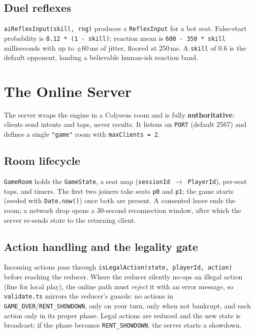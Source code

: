 \documentclass[11pt,a4paper]{article}
\newcommand{\code}[1]{\texttt{#1}}
\begin{document}
\subsection{Duel reflexes}
\code{aiReflexInput(skill, rng)} produces a \code{ReflexInput} for a bot seat.
False-start probability is \code{0.12 * (1 - skill)}; reaction mean is
\code{600 - 350 * skill} milliseconds with up to $\pm$60\,ms of jitter, floored
at 250\,ms. A \code{skill} of 0.6 is the default opponent, landing a believable
human-ish reaction band.

\section{The Online Server}

The server wraps the engine in a Colyseus room and is fully
\textbf{authoritative}: clients send intents and taps, never results. It listens
on \code{PORT} (default 2567) and defines a single \code{"game"} room with
\code{maxClients = 2}.

\subsection{Room lifecycle}
\code{GameRoom} holds the \code{GameState}, a seat map
(\code{sessionId $\to$ PlayerId}), per-seat taps, and timers. The first two
joiners take seats \code{p0} and \code{p1}; the game starts (seeded with
\code{Date.now()}) once both are present. A consented leave ends the room; a
network drop opens a 30-second reconnection window, after which the server
re-sends state to the returning client.

\subsection{Action handling and the legality gate}
Incoming actions pass through \code{isLegalAction(state, playerId, action)}
before reaching the reducer. Where the reducer silently no-ops an illegal
action (fine for local play), the online path must \emph{reject} it with an
error message, so \code{validate.ts} mirrors the reducer's guards: no actions in
\code{GAME\_OVER}/\code{RENT\_SHOWDOWN}, only on your turn, only when not
bankrupt, and each action only in its proper phase. Legal actions are reduced
and the new state is broadcast; if the phase becomes \code{RENT\_SHOWDOWN}, the
server starts a showdown.
\end{document}
